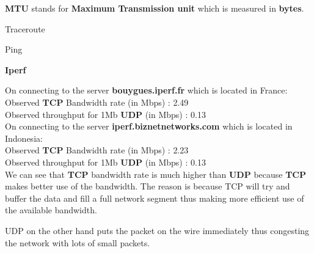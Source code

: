 \documentclass{article}
\theoremstyle{remark}
\newcommand{\tbf}[1]{\textbf{#1}}
\begin{document}
  
\tbf{MTU} stands for \tbf{Maximum Transmission unit} which is measured in \tbf{bytes}.

\large{Traceroute}



\large{Ping}

\begin{table}[H]
    \centering
    \caption{Ping Data}
    \label{Table 1:}
\end{table}

\tbf{\large{Iperf}}

On connecting to the server \tbf{bouygues.iperf.fr} which is located in France: \\
Observed \tbf{TCP} Bandwidth rate (in Mbps) : 2.49  \\
Observed throughput for 1Mb \tbf{UDP} (in Mbps) : 0.13 \\



On connecting to the server \tbf{iperf.biznetnetworks.com} which is located in Indonesia: \\
Observed \tbf{TCP} Bandwidth rate (in Mbps) : 2.23  \\
Observed throughput for 1Mb \tbf{UDP} (in Mbps) : 0.13 \\

We can see that \tbf{TCP} bandwidth rate is much higher than \tbf{UDP} because \tbf{TCP} 
makes better use of the bandwidth.
The reason is because TCP will try and buffer the data and fill a full network segment thus making more efficient use of the available bandwidth.

UDP on the other hand puts the packet on the wire immediately thus congesting the network with lots of small packets.
\end{document}
